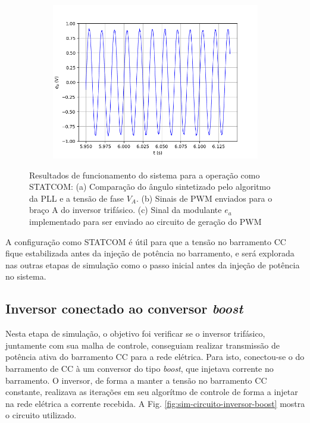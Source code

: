 \begin{figure}[!hbt]
\begin{subfigure}[b]{0.49\textwidth}
		\caption{}
	\end{subfigure}
	\begin{subfigure}[b]{0.49\textwidth}
		\centering
		\includegraphics[width=\textwidth]{figuras/sim_figures/statcom/modulante.png}
		\caption{}
	\end{subfigure}

	\caption{Resultados de funcionamento do sistema para a operação como STATCOM: (a) Comparação do ângulo sintetizado pelo algoritmo da PLL e a tensão de fase $V_A$. (b) Sinais de PWM enviados para o braço A do inversor trifásico. (c) Sinal da modulante $e_a$ implementado para ser enviado ao circuito de geração do PWM}
    \label{fig:sim-statcom2}
\end{figure}

A configuração como STATCOM é útil para que a tensão no barramento CC fique estabilizada antes da injeção de potência no barramento, 
e será explorada nas outras etapas de simulação como o passo inicial antes da injeção de potência no sistema.

\subsection{Inversor conectado ao conversor \textit{boost}}

Nesta etapa de simulação, o objetivo foi verificar se o inversor trifásico, juntamente com sua malha de controle, conseguiam realizar transmissão de potência ativa do barramento CC para a rede elétrica. 
Para isto, conectou-se o do barramento de CC à um conversor do tipo \textit{boost}, que injetava corrente no barramento.
O inversor, de forma a manter a tensão no barramento CC constante, realizava as iterações em seu algorítmo de controle de forma a injetar na rede elétrica a corrente recebida.
A Fig. \ref{fig:sim-circuito-inversor-boost} mostra o circuito utilizado.

